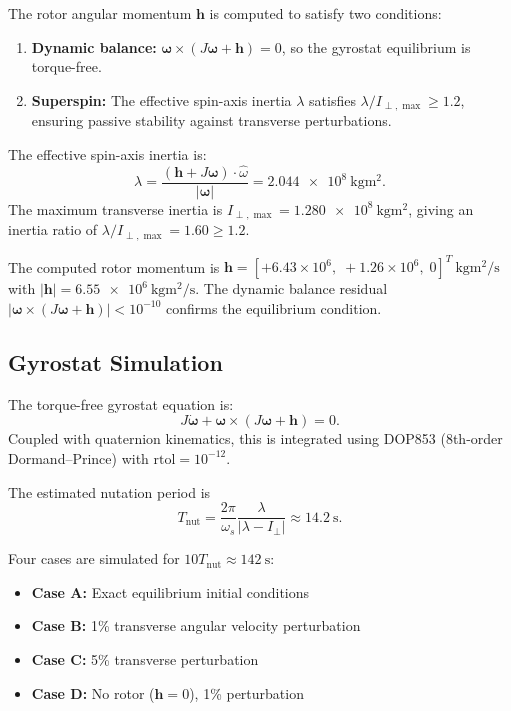 \documentclass[conference]{IEEEtran}
\begin{document}
The rotor angular momentum $\bm{h}$ is computed to satisfy two conditions:
\begin{enumerate}
  \item \textbf{Dynamic balance:}
    $\bm{\omega} \times (J\bm{\omega} + \bm{h}) = 0$,
    so the gyrostat equilibrium is torque-free.
  \item \textbf{Superspin:}
    The effective spin-axis inertia $\lambda$ satisfies
    $\lambda / I_{\perp,\max} \geq 1.2$,
    ensuring passive stability against transverse perturbations.
\end{enumerate}

The effective spin-axis inertia is:
\begin{equation}
  \lambda = \frac{(\bm{h} + J\bm{\omega}) \cdot \hat{\omega}}{|\bm{\omega}|}
  = \SI{2.044e8}{\kilo\gram\meter\squared}.
\end{equation}
The maximum transverse inertia is $I_{\perp,\max} = \SI{1.280e8}{\kilo\gram\meter\squared}$,
giving an inertia ratio of $\lambda / I_{\perp,\max} = 1.60 \geq 1.2$.

The computed rotor momentum is
$\bm{h} = [+6.43 \times 10^6,\; +1.26 \times 10^6,\; 0]^T~\si{\kilo\gram\meter\squared/\second}$
with $|\bm{h}| = \SI{6.55e6}{\kilo\gram\meter\squared/\second}$.
The dynamic balance residual $|\bm{\omega} \times (J\bm{\omega} + \bm{h})| < 10^{-10}$
confirms the equilibrium condition.

\subsection{Gyrostat Simulation}

The torque-free gyrostat equation is:
\begin{equation}
  J\dot{\bm{\omega}} + \bm{\omega} \times (J\bm{\omega} + \bm{h}) = 0.
\end{equation}
Coupled with quaternion kinematics, this is integrated using DOP853 (8th-order
Dormand--Prince) with $\text{rtol} = 10^{-12}$.

The estimated nutation period is
\begin{equation}
  T_{\text{nut}} = \frac{2\pi}{\omega_s} \frac{\lambda}{|\lambda - I_\perp|}
  \approx \SI{14.2}{\second}.
\end{equation}

Four cases are simulated for $10 T_{\text{nut}} \approx \SI{142}{\second}$:
\begin{itemize}
  \item \textbf{Case A:} Exact equilibrium initial conditions
  \item \textbf{Case B:} 1\% transverse angular velocity perturbation
  \item \textbf{Case C:} 5\% transverse perturbation
  \item \textbf{Case D:} No rotor ($\bm{h}=0$), 1\% perturbation
\end{itemize}
\end{document}
